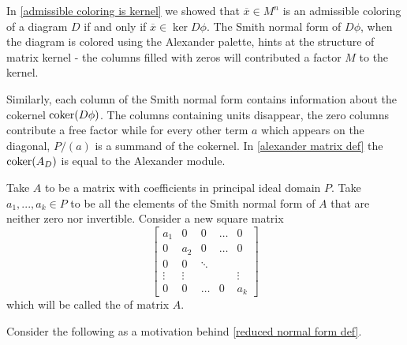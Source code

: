 In \cref{admissible coloring is kernel} we showed that $\overline{x}\in M^n$ is an admissible coloring of a diagram $D$ if and only if $\overline{x}\in\ker D\phi$. The Smith normal form of $D\phi$, when the diagram is colored using the Alexander palette, hints at the structure of matrix kernel - the columns filled with zeros will contributed a factor $M$ to the kernel. 

Similarly, each column of the Smith normal form contains information about the cokernel $\operatorname{coker}(D\phi)$. The columns containing units disappear, the zero columns contribute a free factor while for every other term $a$ which appears on the diagonal, $P/(a)$ is a summand of the cokernel. In \cref{alexander matrix def} the $\operatorname{coker}(A_D)$ is equal to the Alexander module.




\begin{definition}\label{reduced normal form def}
  Take $A$ to be a matrix with coefficients in principal ideal domain $P$. Take $a_1,...,a_k\in P$ to be all the elements of the Smith normal form of $A$ that are neither zero nor invertible. Consider a new square matrix 
  $$
  \begin{bmatrix}
    a_1 & 0 & 0 & \hdots & 0\\ 
    0 & a_2 & 0 & \hdots & 0 \\ 
    0 & 0 & \ddots & &  \\ 
    \vdots & \vdots & & & \vdots \\ 
    0 & 0 & \hdots & 0 & a_k
  \end{bmatrix}
  $$
  which will be called the  of matrix $A$.
\end{definition}

Consider the following as a motivation behind \cref{reduced normal form def}.

